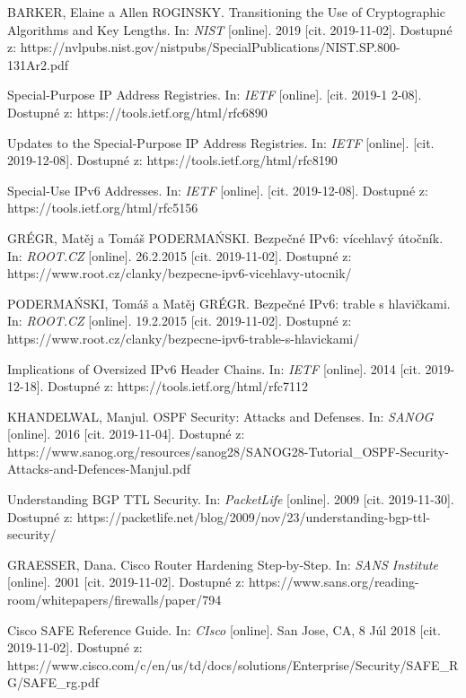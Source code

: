 \begin{literatura}{99}
BARKER, Elaine a Allen ROGINSKY. Transitioning the Use of Cryptographic Algorithms and Key Lengths. In: \textit{NIST} [online]. 2019 [cit. 2019-11-02]. Dostupné z: https://nvlpubs.nist.gov/nistpubs/SpecialPublications/NIST.SP.800-131Ar2.pdf

Special-Purpose IP Address Registries. In: \textit{IETF} [online]. [cit. 2019-1
2-08]. Dostupné z: https://tools.ietf.org/html/rfc6890

Updates to the Special-Purpose IP Address Registries. In: \textit{IETF} [online]. [cit. 2019-12-08]. Dostupné z: https://tools.ietf.org/html/rfc8190

Special-Use IPv6 Addresses. In: \textit{IETF} [online]. [cit. 2019-12-08]. Dostupné z: https://tools.ietf.org/html/rfc5156

GRÉGR, Matěj a Tomáš PODERMAŃSKI. Bezpečné IPv6: vícehlavý útočník. In: \textit{ROOT.CZ} [online]. 26.2.2015 [cit. 2019-11-02]. Dostupné z: https://www.root.cz/clanky/bezpecne-ipv6-vicehlavy-utocnik/

PODERMAŃSKI, Tomáš a Matěj GRÉGR. Bezpečné IPv6: trable s hlavičkami. In: \textit{ROOT.CZ} [online]. 19.2.2015 [cit. 2019-11-02]. Dostupné z: https://www.root.cz/clanky/bezpecne-ipv6-trable-s-hlavickami/

Implications of Oversized IPv6 Header Chains. In: \textit{IETF} [online]. 2014 [cit. 2019-12-18]. Dostupné z: https://tools.ietf.org/html/rfc7112


KHANDELWAL, Manjul. OSPF Security: Attacks and Defenses. In: \textit{SANOG} [online]. 2016 [cit. 2019-11-04]. Dostupné z: https://www.sanog.org/resources/sanog28/SANOG28-Tutorial\_OSPF-Security-Attacks-and-Defences-Manjul.pdf

Understanding BGP TTL Security. In: \textit{PacketLife} [online]. 2009 [cit. 2019-11-30]. Dostupné z: https://packetlife.net/blog/2009/nov/23/understanding-bgp-ttl-security/

GRAESSER, Dana. Cisco Router Hardening Step-by-Step. In: \textit{SANS Institute} [online]. 2001 [cit. 2019-11-02]. Dostupné z: https://www.sans.org/reading-room/whitepapers/firewalls/paper/794

Cisco SAFE Reference Guide. In: \textit{CIsco} [online]. San Jose, CA, 8 Júl 2018 [cit. 2019-11-02]. Dostupné z: https://www.cisco.com/c/en/us/td/docs/solutions/Enterprise/Security/SAFE\_RG/SAFE\_rg.pdf


\end{literatura}
